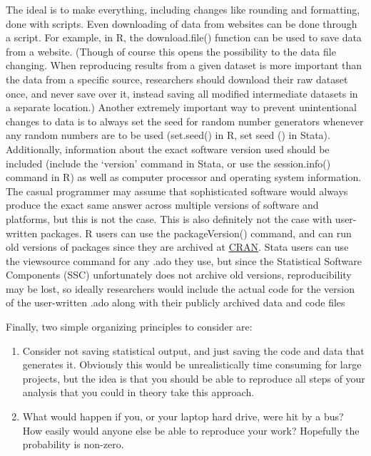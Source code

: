 \documentclass[12pt] {article}
\begin{document}
The ideal is to make everything, including changes like rounding and
formatting, done with scripts. Even downloading of data from websites
can be done through a script. For example, in R, the download.file()
function can be used to save data from a website. (Though of course this
opens the possibility to the data file changing. When reproducing
results from a given dataset is more important than the data from a
specific source, researchers should download their raw dataset once, and
never save over it, instead saving all modified intermediate datasets in
a separate location.) Another extremely important way to prevent
unintentional changes to data is to always set the seed for random
number generators whenever any random numbers are to be used (set.seed()
in R, set seed () in Stata). Additionally, information about the exact
software version used should be included (include the `version' command in Stata, or use the
session.info() command in R) as well as computer processor and operating
system information. The casual programmer may assume that sophisticated
software would always produce the exact same answer across multiple
versions of software and platforms, but this is not the case. This is also definitely not the case with user-written packages. R users can use the packageVersion() command, and can run old versions of packages since they are archived at \href{http://cran.r-project.org}{CRAN}. Stata users can use the viewsource command for any .ado they use, but since the Statistical Software Components (SSC) unfortunately does not archive old versions, reproducibility may be lost, so ideally researchers would include the actual code for the version of the user-written .ado along with their publicly archived data and code files


Finally, two simple organizing principles to consider are:
\begin{enumerate}
\item 
 Consider not saving statistical output, and just saving the code and data that generates it. Obviously this would be unrealistically time consuming for large projects, but the idea is that you should be able to reproduce all steps of your analysis that you could in theory take this approach.

\item
What would happen if you, or your laptop hard drive, were hit by a bus? How easily would anyone else be able to reproduce your work? Hopefully the probability is non-zero.
\end{enumerate}
\end{document}
